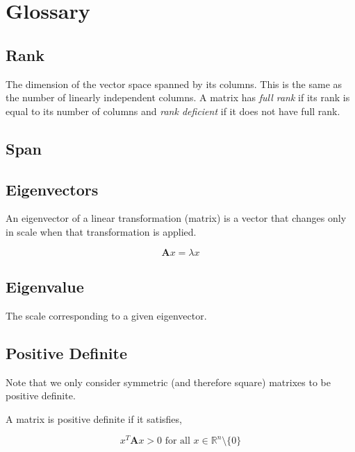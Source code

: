 \documentclass{article}
\begin{document}
\noindent{}
\tableofcontents

\section{Glossary}

\subsection{Rank}

The dimension of the vector space spanned by its columns. This is the same as the number of linearly independent columns.
A matrix has {\em full rank\/} if its rank is equal to its number of columns and {\em rank deficient\/} if it does not have full rank.

\subsection{Span}

\subsection{Eigenvectors}

An eigenvector of a linear transformation (matrix) is a vector that changes only in scale when that transformation is applied.

\begin{equation}
    \boldsymbol{A} x = \lambda x
\end{equation}


\subsection{Eigenvalue}

The scale corresponding to a given eigenvector.

\subsection{Positive Definite}

Note that we only consider symmetric (and therefore square) matrixes to be positive definite.

A matrix is positive definite if it satisfies,

\begin{equation}
    x^T \boldsymbol{A} x > 0 \text{ for all } x \in \mathbb{R}^n \setminus \{ 0 \}
\end{equation}
\end{document}
